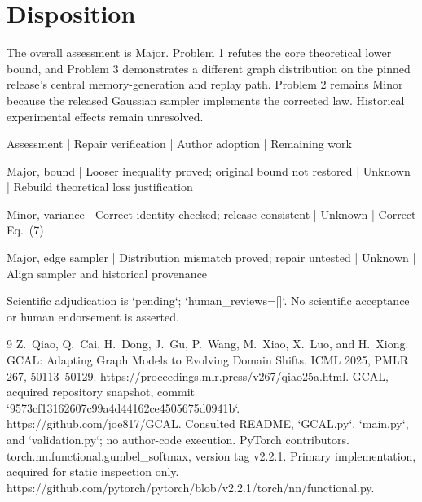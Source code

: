\documentclass[10pt]{article}
\begin{document}
\section*{Disposition}
The overall assessment is Major. Problem 1 refutes the core theoretical lower bound, and Problem 3 demonstrates a different graph distribution on the pinned release’s central memory-generation and replay path. Problem 2 remains Minor because the released Gaussian sampler implements the corrected law. Historical experimental effects remain unresolved.\par
Assessment | Repair verification | Author adoption | Remaining work\par
Major, bound | Looser inequality proved; original bound not restored | Unknown | Rebuild theoretical loss justification\par
Minor, variance | Correct identity checked; release consistent | Unknown | Correct Eq. (7)\par
Major, edge sampler | Distribution mismatch proved; repair untested | Unknown | Align sampler and historical provenance\par
Scientific adjudication is `pending`; `human\_reviews=[]`. No scientific acceptance or human endorsement is asserted.\par
9 Z. Qiao, Q. Cai, H. Dong, J. Gu, P. Wang, M. Xiao, X. Luo, and H. Xiong. GCAL: Adapting Graph Models to Evolving Domain Shifts. ICML 2025, PMLR 267, 50113–50129. https://proceedings.mlr.press/v267/qiao25a.html. GCAL, acquired repository snapshot, commit `9573cf13162607c99a4d44162ce4505675d0941b`. https://github.com/joe817/GCAL. Consulted README, `GCAL.py`, `main.py`, and `validation.py`; no author-code execution. PyTorch contributors. torch.nn.functional.gumbel\_softmax, version tag v2.2.1. Primary implementation, acquired for static inspection only. https://github.com/pytorch/pytorch/blob/v2.2.1/torch/nn/functional.py.\par
\end{document}
